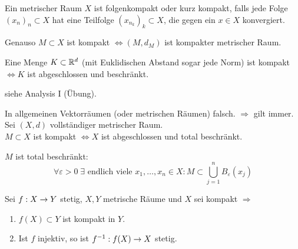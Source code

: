 \documentclass[../ana2.tex]{subfiles}
\begin{document}
\begin{defi}[Folgenkompakt]
    Ein metrischer Raum \( X \) ist folgenkompakt oder kurz kompakt, 
    falls jede Folge \((x_n)_n \subset X \) hat eine Teilfolge
    \( (x_{n_k})_k \subset X \), die gegen ein \( x \in X \) konvergiert. 
\end{defi}
\begin{bem}
    Genauso \(M \subset X\) ist kompakt \( \Leftrightarrow (M, d_M) \) ist
    kompakter metrischer Raum. 
\end{bem}
\begin{satz}
    Eine Menge \( K \subset \mathbb{R}^d \) (mit Euklidischen Abstand sogar jede
    Norm) ist kompakt \( \Leftrightarrow K \) ist abgeschlossen und
    beschränkt.
\end{satz}
\begin{bew}
    siehe Analysis I (Übung).
\end{bew}
\begin{bem}
    In allgemeinen Vektorräumen (oder metrischen Räumen) falsch.
    \( \Rightarrow \) gilt immer.\\
    Sei \((X, d)\) vollständiger metrischer Raum. \\
    \(M \subset X\) ist kompakt \(\Leftrightarrow X\) ist abgeschlossen
    und total beschränkt.
\end{bem}
\begin{defi*}
    \(M\) ist total beschränkt: 
    \[ \forall \varepsilon > 0 \; 
    \exists \text{ endlich viele } x_1,\dots,x_n \in X:
    M \subset \bigcup_{j=1}^n B_\varepsilon(x_j) \]
\end{defi*}
\begin{kor}
    Sei \( f:X\rightarrow Y \) stetig, \( X, Y \) metrische Räume
    und \(X\) sei kompakt
    \( \Rightarrow \)
    \begin{enumerate}
        \item \( f(X) \subset Y \) ist kompakt in \( Y \).
        \item Ist \(f\) injektiv, so ist \( f^{-1}:f(X)\rightarrow X \)
        stetig.
    \end{enumerate}
\end{kor}
\end{document}
